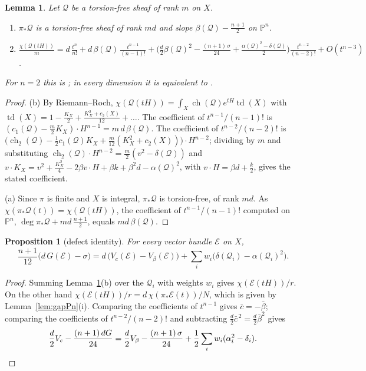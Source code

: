 \documentclass[11pt]{amsart}
\newtheorem{proposition}[theorem]{Proposition}
\newtheorem{lemma}[theorem]{Lemma}
\theoremstyle{definition}
\theoremstyle{remark}
\newcommand{\PP}{\mathbb{P}}
\newcommand{\cE}{\mathcal{E}}
\newcommand{\cQ}{\mathcal{Q}}
\begin{document}
\begin{lemma}\label{lem:push}
Let $\cQ$ be a torsion-free sheaf of rank $m$ on $X$.
\begin{enumerate}[label=\textup{(\alph*)}]
\item $\pi_*\cQ$ is a torsion-free sheaf of rank $md$ and slope $\beta(\cQ)-\frac{n+1}2$ on $\PP^n$.
\item $\displaystyle\frac{\chi(\cQ(tH))}m=d\,\frac{t^n}{n!}+d\,\beta(\cQ)\,\frac{t^{n-1}}{(n-1)!}+\Big(\frac d2\beta(\cQ)^2-\frac{(n+1)\,\sigma}{24}+\frac{\alpha(\cQ)^2-\delta(\cQ)}2\Big)\frac{t^{n-2}}{(n-2)!}+O(t^{n-3})$.
\end{enumerate}
For $n=2$ this is \cite[Lemma~2.1 and (2)]{An2}; in every dimension it is equivalent to \cite[Prop.~10.6]{An3}.
\end{lemma}

\begin{proof}
(b) By Riemann--Roch, $\chi(\cQ(tH))=\int_X\operatorname{ch}(\cQ)e^{tH}\operatorname{td}(X)$ with $\operatorname{td}(X)=1-\frac{K_X}2+\frac{K_X^2+c_2(X)}{12}+\dots$. The coefficient of $t^{n-1}/(n-1)!$ is $(c_1(\cQ)-\frac m2K_X)\cdot H^{n-1}=m\,d\,\beta(\cQ)$. The coefficient of $t^{n-2}/(n-2)!$ is $\big(\operatorname{ch}_2(\cQ)-\frac12c_1(\cQ)K_X+\frac m{12}(K_X^2+c_2(X))\big)\cdot H^{n-2}$; dividing by $m$ and substituting $\operatorname{ch}_2(\cQ)\cdot H^{n-2}=\frac m2(v^2-\delta(\cQ))$ and $v\cdot K_X=v^2+\frac{K_X^2}4-2\beta v\cdot H+\beta k+\beta^2d-\alpha(\cQ)^2$, with $v\cdot H=\beta d+\frac k2$, gives the stated coefficient.

(a) Since $\pi$ is finite and $X$ is integral, $\pi_*\cQ$ is torsion-free, of rank $md$. As $\chi(\pi_*\cQ(t))=\chi(\cQ(tH))$, the coefficient of $t^{n-1}/(n-1)!$ computed on $\PP^n$, $\deg\pi_*\cQ+md\,\frac{n+1}2$, equals $md\,\beta(\cQ)$.
\end{proof}

\begin{proposition}[defect identity]\label{prop:defect}
For every vector bundle $\cE$ on $X$,
\[
\frac{n+1}{12}\big(d\,G(\cE)-\sigma\big)=d\,\big(V_c(\cE)-V_\beta(\cE)\big)+\sum_iw_i\big(\delta(\cQ_i)-\alpha(\cQ_i)^2\big).
\]
\end{proposition}

\begin{proof}
Summing Lemma~\ref{lem:push}(b) over the $\cQ_i$ with weights $w_i$ gives $\chi(\cE(tH))/r$. On the other hand $\chi(\cE(tH))/r=d\,\chi(\pi_*\cE(t))/N$, which is given by Lemma~\ref{lem:gapPn}(i). Comparing the coefficients of $t^{n-1}$ gives $\bar c=-\bar\beta$; comparing the coefficients of $t^{n-2}/(n-2)!$ and subtracting $\frac d2\bar c^{\,2}=\frac d2\bar\beta^2$ gives
\[
\frac d2V_c-\frac{(n+1)\,dG}{24}=\frac d2V_\beta-\frac{(n+1)\,\sigma}{24}+\frac12\sum_iw_i(\alpha_i^2-\delta_i). \qedhere
\]
\end{proof}
\end{document}
